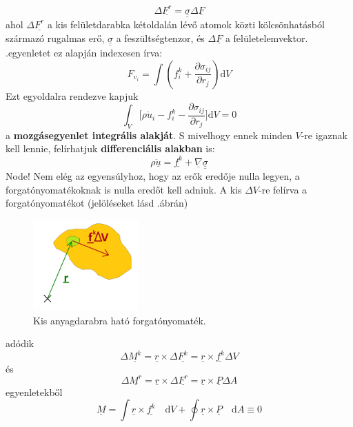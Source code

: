\documentclass[a4paper, 12pt, titlepage]{article}
\begin{document}
\[\Delta\underline{F^{r}}=\underline{\underline{\sigma}}\Delta\underline{F}\]
ahol $\Delta\underline{F^{r}}$ a kis felületdarabka kétoldalán lévő atomok közti kölcsönhatásból származó rugalmas erő, $\underline{\underline{\sigma}}$ a feszültségtenzor, és $\Delta\underline{F}$ a felületelemvektor.
\newline
{}.\hspace{1mm}egyenletet ez alapján indexesen írva:
\[F_{v_{i}}=\int(f^{k}_{i}+\frac{\partial\sigma_{ij}}{\partial r_{j}})\mathrm{d}V\] %
Ezt egyoldalra rendezve kapjuk
	\begin{equation}
\int_{V}\biggl[\rho\ddot{u}_{i}-f^{k}_{i}-\frac{\partial\sigma_{ij}}{\partial r_{j}}\biggr]\mathrm{d}V
	\label{eq:int} = 0
	\end{equation}
a \textbf{mozgásegyenlet integrális alakját}. S mivelhogy ennek minden $V$-re igaznak kell lennie, felírhatjuk \textbf{differenciális alakban} is:
	\begin{equation}
\rho\underline{\ddot{u}}=\underline{f^{k}}+\underline{\nabla}\underline{\underline{\sigma}}
	\label{eq:diff}
	\end{equation}
\newline
\newline
Node! Nem elég az egyensúlyhoz, hogy az erők eredője nulla legyen, a forgatónyomatékoknak is nulla eredőt kell adniuk. A kis $\Delta V$-re felírva a forgatónyomatékot (jelöléseket lásd .\hspace{1mm}ábrán)
	\begin{figure}[!h]
	\includegraphics[height=3.5cm]{./M.png} %
	\centering
	\caption{Kis anyagdarabra ható forgatónyomaték.}
	\label{fig:M}
	\end{figure}
adódik
\[\Delta\underline{M^{k}}=\underline{r}\times\Delta\underline{F^{k}}=\underline{r}\times\underline{f^{k}}\Delta V\]
és
\[\Delta\underline{M^{r}}=\underline{r}\times\Delta\underline{F^{r}}=\underline{r}\times\underline{P}\Delta A\]
egyenletekből
	\begin{equation}
\underline{M}=\int\underline{r}\times\underline{f^{k}}\quad\mathrm{d}V+\oint\underline{r}\times\underline{P}\quad\mathrm{d}A\equiv 0
	\label{eq:M}
	\end{equation}
\end{document}
